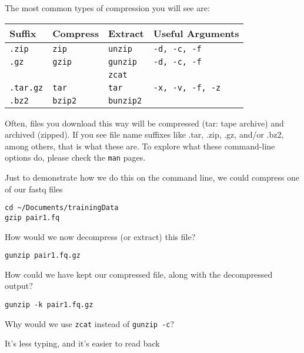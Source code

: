 The most common types of compression you will see are:\\
\begin{center}
	\begin{tabular}{ p{2cm}  p{3cm}  p{3cm}   p{4cm}}
		\toprule
		\textbf{Suffix} & \textbf{Compress} & \textbf{Extract} & \textbf{Useful Arguments} \\
		\midrule
		\texttt{.zip} & \texttt{zip} & \texttt{unzip} & \texttt{-d, -c, -f} \\
		\midrule
		\texttt{.gz} & \texttt{gzip} & \texttt{gunzip} & \texttt{-d, -c, -f} \\
								 &								& \texttt{zcat} & \\
		\midrule
		\texttt{.tar.gz} & \texttt{tar} & \texttt{tar} & \texttt{-x, -v, -f, -z} \\
		\midrule
		\texttt{.bz2} & \texttt{bzip2} & \texttt{bunzip2} & \\
		\bottomrule
	\end{tabular}
\end{center}

Often, files you download this way will be compressed (tar: tape archive) and archived (zipped). 
If you see file name suffixes like .tar, .zip, .gz, and/or .bz2, among others, that is what these are.  
To explore what these command-line options do, please check the \texttt{man} pages. \\

\begin{steps}
Just to demonstrate how we do this on the command line, we could compress one of our fastq files
\begin{lstlisting}
cd ~/Documents/trainingData
gzip pair1.fq
\end{lstlisting}
\end{steps}

\begin{questions}
How would we now decompress (or extract) this file?\\
\begin{answer}
\texttt{gunzip  pair1.fq.gz}\\
\end{answer}

How could we have kept our compressed file, along with the decompressed output?\\
\begin{answer}
\texttt{gunzip -k pair1.fq.gz}\\
\end{answer}

Why would we use \texttt{zcat} instead of \texttt{gunzip -c}?\\
\begin{answer}
It's less typing, and it's easier to read back
\end{answer}
\end{questions}


